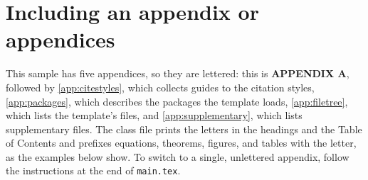 
\chapter{Including an appendix or appendices}
\label{app:appendixA}



This sample has five appendices, so they are lettered: this is \textbf{APPENDIX A}, followed by \cref{app:citestyles}, which collects guides to the citation styles, \cref{app:packages}, which describes the packages the template loads, \cref{app:filetree}, which lists the template's files, and \cref{app:supplementary}, which lists supplementary files. The class file prints the letters in the headings and the Table of Contents and prefixes equations, theorems, figures, and tables with the letter, as the examples below show. To switch to a single, unlettered appendix, follow the instructions at the end of \texttt{main.tex}.



